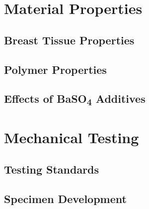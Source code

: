 \section{Material Properties\label{sec:literatureReview:materials}}

\subsection{Breast Tissue Properties\label{sec:literatureReview:materials:breast}}

\subsection{Polymer Properties\label{sec:literatureReview:materials:polymers}}

\subsection{Effects of BaSO\textsubscript{4} Additives\label{sec:literatureReview:materials:BaSO4}}

\section{Mechanical Testing\label{sec:literatureReview:testing}}

\subsection{Testing Standards\label{sec:literatureReview:testing:standards}}

\subsection{Specimen Development\label{sec:literatureReview:testing:specimens}}

